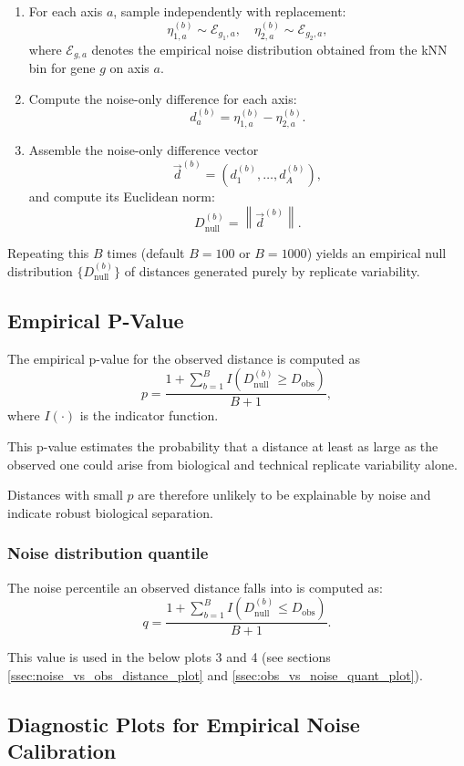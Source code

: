 \documentclass{article}
\begin{document}
\begin{enumerate}
\item For each axis $a$, sample independently with replacement:
\[
\eta_{1,a}^{(b)} \sim \mathcal{E}_{g_1,a}, \quad
\eta_{2,a}^{(b)} \sim \mathcal{E}_{g_2,a},
\]
where $\mathcal{E}_{g,a}$ denotes the empirical noise distribution obtained from the kNN bin for gene $g$ on axis $a$.
\item Compute the noise-only difference for each axis:
\[
d_a^{(b)} = \eta_{1,a}^{(b)} - \eta_{2,a}^{(b)}.
\]
\item Assemble the noise-only difference vector
\[
\vec{d}^{(b)} = (d_1^{(b)}, \ldots, d_A^{(b)}),
\]
and compute its Euclidean norm:
\[
D_{\mathrm{null}}^{(b)} = \left\| \vec{d}^{(b)} \right\|.
\]
\end{enumerate}

Repeating this $B$ times (default $B=100$ or $B=1000$) yields an empirical null distribution $\{D_{\mathrm{null}}^{(b)}\}$ of distances generated purely by replicate variability.

\subsection{Empirical P-Value}

The empirical p-value for the observed distance is computed as
\[
p = \frac{1 + \sum_{b=1}^{B} I\!\left(D_{\mathrm{null}}^{(b)} \ge D_{\mathrm{obs}}\right)}{B + 1},
\]
where $I(\cdot)$ is the indicator function.

This p-value estimates the probability that a distance at least as large as the observed one could arise from biological and technical replicate variability alone.

Distances with small $p$ are therefore unlikely to be explainable by noise and indicate robust biological separation.

\subsubsection{Noise distribution quantile}

The noise percentile an observed distance falls into is computed as:
\[
q = \frac{1 + \sum_{b=1}^{B} I\!\left(D_{\mathrm{null}}^{(b)} \le D_{\mathrm{obs}}\right)}{B + 1}.
\]

This value is used in the below plots 3 and 4 (see sections \ref{ssec:noise_vs_obs_distance_plot} and \ref{ssec:obs_vs_noise_quant_plot}).

\subsection{Diagnostic Plots for Empirical Noise Calibration}
\end{document}
